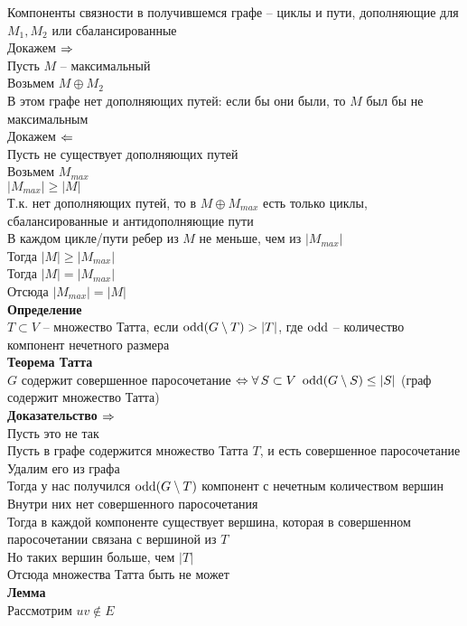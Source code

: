 \documentclass[12pt]{article}
\begin{document}
Компоненты связности в получившемся графе -- циклы и пути, дополняющие для $M_1,M_2$ или сбалансированные\\
Докажем $\Rightarrow$\\
Пусть $M$ -- максимальный\\
Возьмем $M\oplus M_2$\\
В этом графе нет дополняющих путей: если бы они были, то $M$ был бы не максимальным\\
Докажем $\Leftarrow$\\
Пусть не существует дополняющих путей\\
Возьмем $M_{max}$\\
$|M_{max}| \geq |M|$\\
Т.к. нет дополняющих путей, то в $M\oplus M_{max}$ есть только циклы, сбалансированные и антидополняющие пути\\
В каждом цикле/пути ребер из $M$ не меньше, чем из $|M_{max}|$\\
Тогда $|M| \geq |M_{max}|$\\
Тогда $|M| = |M_{max}|$\\
Отсюда $|M_{max}| = |M|$\\
\textbf{Определение}\\
$T \subset V$ --  множество Татта, если $\operatorname{odd}(G\setminus T) > |T|$, где $\operatorname{odd}$ -- количество компонент нечетного размера\\
\textbf{Теорема Татта}\\
$G$ содержит совершенное паросочетание $\Leftrightarrow \forall\, S \subset V\ \operatorname{odd}(G \setminus S) \leq |S|$ (граф содержит множество Татта)\\
\textbf{Доказательство $\Rightarrow$}\\
Пусть это не так\\
Пусть в графе содержится множество Татта $T$, и есть совершенное паросочетание\\
Удалим его из графа\\
Тогда у нас получился $\operatorname{odd}(G\setminus T)$ компонент с нечетным количеством вершин\\
Внутри них нет совершенного паросочетания\\
Тогда в каждой компоненте существует вершина, которая в совершенном паросочетании связана с вершиной из $T$\\
Но таких вершин больше, чем $|T|$\\
Отсюда множества Татта быть не может\\
\textbf{Лемма}\\
Рассмотрим $uv \not\in E$\\
\end{document}
